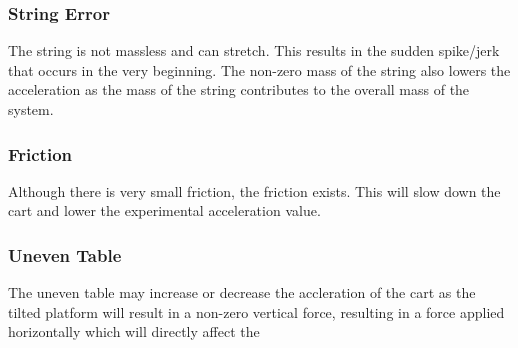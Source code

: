 \documentclass{article}
\begin{document}
\subsubsection{String Error}
The string is not massless and can stretch. This results in the sudden spike/jerk that occurs in the very beginning. The non-zero mass of the string also lowers the acceleration as the mass of the string contributes to the overall mass of the system.

\subsubsection{Friction}
Although there is very small friction, the friction exists. This will slow down the cart and lower the experimental acceleration value.

\subsubsection{Uneven Table}
The uneven table may increase or decrease the accleration of the cart as the tilted platform will result in a non-zero vertical force, resulting in a force applied horizontally which will directly affect the 
\end{document}
